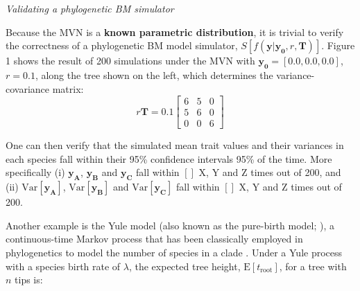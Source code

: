\documentclass[oneside]{article}
\begin{document}
\begin{tcolorbox}[breakable, width=\textwidth, colback=gray!10, boxrule=0pt,
  title=Box 1: Models characterized by well-known parametric distributions, fonttitle=\bfseries]
\vspace{.25cm}
\emph{Validating a phylogenetic BM simulator}

Because the MVN is a \textbf{known parametric
  distribution}, it is trivial to verify the correctness of a
phylogenetic BM model simulator, $S[f(\mathbf{y}|\boldsymbol{y_0},r,\boldsymbol{T})]$.
Figure 1 shows the result of 200 simulations under the MVN
with $\boldsymbol{y_0} = [0.0, 0.0, 0.0]$, $r = 0.1$, along the tree shown on
the left, which determines the variance-covariance matrix:
\begin{equation}
  r\boldsymbol{T} = 0.1
  \begin{bmatrix}
    6 & 5 & 0\\
    5 & 6 & 0\\
    0 & 0 & 6
  \end{bmatrix}
  \label{eq:mat}
\end{equation}

One can then verify that the simulated mean trait values and their
variances in each species fall within their 95\% confidence intervals
95\% of the time.
More specifically (i) $\boldsymbol{y_{\text{A}}}$, $\boldsymbol{y_{\text{B}}}$ and 
$\boldsymbol{y_{\text{C}}}$ fall within $[]$ X, Y and Z times out of 200, and 
(ii) $\text{Var}[\boldsymbol{y_{\text{A}}}]$,
$\text{Var}[\boldsymbol{y_{\text{B}}}]$ and
$\text{Var}[\boldsymbol{y_{\text{C}}}]$ 
fall within $[]$ X, Y and Z times out of 200.
%
%
\end{tcolorbox}

Another example is the Yule model (also known as the pure-birth model;
\citealt{yule24}), a continuous-time Markov process that has been
classically employed in phylogenetics to model the number of
species in a clade \citep{yule24,aldous01}.
Under a Yule process with a species birth rate of $\lambda$, the
expected tree height, $\text{E}[t_{\text{root}}]$, for
a tree with $n$ tips is:
\end{document}
